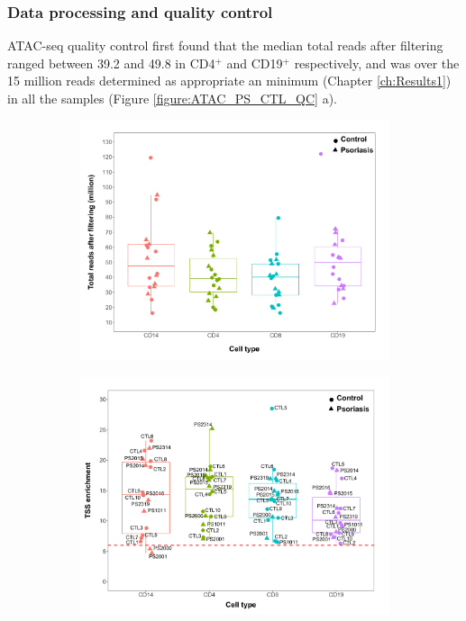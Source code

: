 \subsubsection{Data processing and quality control}
ATAC-seq quality control first found that the median total reads after filtering ranged between 39.2 and 49.8 in CD4$^+$ and CD19$^+$ respectively, and was over the 15 million reads determined as appropriate an minimum (Chapter \ref{ch:Results1}) in all the samples (Figure \ref{figure:ATAC_PS_CTL_QC} a). 


\begin{figure}[htbp]
\centering
\begin{subfigure}{0.5\textwidth}
\centering
\includegraphics[width=\textwidth]{./Results2/pdfs/ATAC_PS_CTL_final_filtered_reads_boxplot}
\caption{\textbf{}}
\end{subfigure}%
\begin{subfigure}{0.5\textwidth}
\centering
\includegraphics[width=\textwidth]{./Results2/pdfs/ATAC_PS_CTL_all_samples_TSS_boxplots_all_labelled}

\end{subfigure}
\end{figure}
